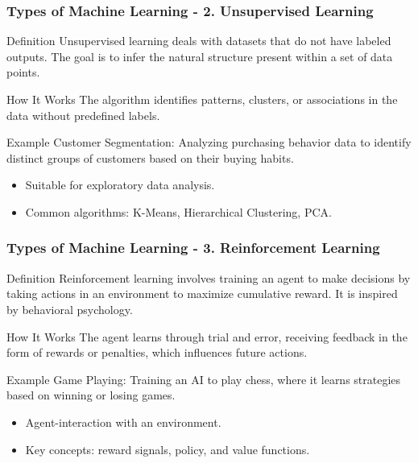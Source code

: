 \documentclass[aspectratio=169]{beamer}
\begin{document}
\begin{frame}[fragile]
    \frametitle{Types of Machine Learning - 2. Unsupervised Learning}
    \begin{block}{Definition}
        Unsupervised learning deals with datasets that do not have labeled outputs. The goal is to infer the natural structure present within a set of data points.
    \end{block}

    \begin{block}{How It Works}
        The algorithm identifies patterns, clusters, or associations in the data without predefined labels.
    \end{block}

    \begin{block}{Example}
        Customer Segmentation: Analyzing purchasing behavior data to identify distinct groups of customers based on their buying habits.
    \end{block}

    \begin{itemize}
        \item Suitable for exploratory data analysis.
        \item Common algorithms: K-Means, Hierarchical Clustering, PCA.
    \end{itemize}

\end{frame}

\begin{frame}[fragile]
    \frametitle{Types of Machine Learning - 3. Reinforcement Learning}
    \begin{block}{Definition}
        Reinforcement learning involves training an agent to make decisions by taking actions in an environment to maximize cumulative reward. It is inspired by behavioral psychology.
    \end{block}

    \begin{block}{How It Works}
        The agent learns through trial and error, receiving feedback in the form of rewards or penalties, which influences future actions.
    \end{block}

    \begin{block}{Example}
        Game Playing: Training an AI to play chess, where it learns strategies based on winning or losing games.
    \end{block}

    \begin{itemize}
        \item Agent-interaction with an environment.
        \item Key concepts: reward signals, policy, and value functions.
    \end{itemize}

\end{frame}
\end{document}
